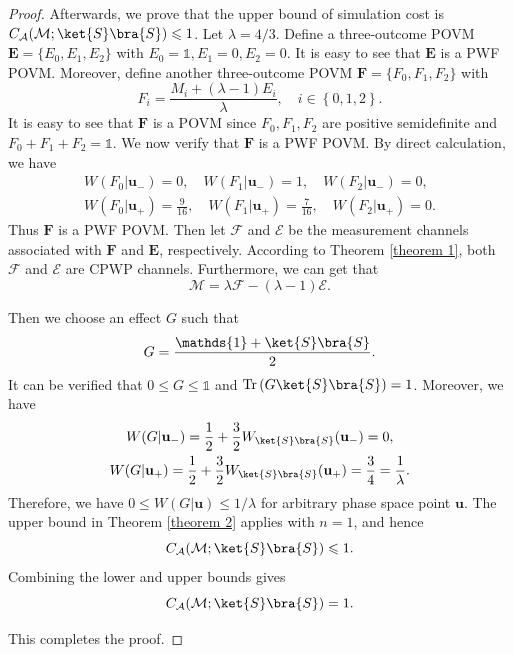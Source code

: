 \documentclass[aps,pra,twocolumn,floatfix,amsfonts,10pt]{revtex4-2}
\begin{document}
\begin{proof}
	Afterwards, we prove that the upper bound of simulation cost is $C_{\mathcal{A}}(\mathcal{M};\ket{S}\bra{S}) \leqslant 1$.
	Let $\lambda=4/3$.
	Define a three-outcome POVM $\mathbf{E}=\{E_0,E_1,E_2\}$ with $E_0=\mathds{1}, E_1=0, E_2=0$.
	It is easy to see that $\mathbf{E}$ is a PWF POVM.
	Moreover, define another three-outcome POVM $\mathbf{F}=\{F_0,F_1,F_2\}$ with
	\begin{equation}
		F_i = \frac{M_i+(\lambda-1)E_i}{\lambda}, \quad i \in \left\{0,1,2\right\}.
	\end{equation}
	It is easy to see that $\mathbf{F}$ is a POVM since $F_0,F_1,F_2$ are positive semidefinite and $F_0+F_1+F_2 = \mathds{1}$. 
	We now verify that $\mathbf{F}$ is a PWF POVM. 
	By direct calculation, we have
	\begin{gather}
		W(F_0|\mathbf{u}_-) = 0, \quad W(F_1|\mathbf{u}_-) = 1, \quad W(F_2|\mathbf{u}_-) = 0, \\ W(F_0|\mathbf{u}_+) = \frac{9}{16}, \quad W(F_1|\mathbf{u}_+) = \frac{7}{16}, \quad W(F_2|\mathbf{u}_+)=0.
	\end{gather}
	Thus $\mathbf{F}$ is a PWF POVM. 
	Then let $\mathcal{F}$ and $\mathcal{E}$ be the measurement channels associated with $\mathbf{F}$ and $\mathbf{E}$, respectively. 
	According to Theorem \ref{theorem 1}, both $\mathcal{F}$ and $\mathcal{E}$ are CPWP channels. 
	Furthermore, we can get that
	\begin{equation}
		\mathcal{M} = \lambda\mathcal{F}-(\lambda-1)\mathcal{E}.
	\end{equation}

	Then we choose an effect $G$ such that
	\begin{equation}
		G = \frac{\mathds{1}+\ket{S}\bra{S}}{2}.
	\end{equation}
	It can be verified that  $0\leqslant G\leqslant\mathds{1}$ and $\mathrm{Tr}\left(G\ket{S}\bra{S}\right) = 1$.
	Moreover, we have
	\begin{gather}
		W(G|\mathbf{u}_-) = \frac{1}{2}+\frac{3}{2}W_{\ket{S}\bra{S}}(\mathbf{u}_-) = 0, \\ W(G|\mathbf{u}_+) = \frac{1}{2}+\frac{3}{2}W_{\ket{S}\bra{S}}(\mathbf{u}_+) = \frac{3}{4} = \frac{1}{\lambda}.
	\end{gather}
	Therefore, we have $0\leqslant W(G|\mathbf{u}) \leqslant 1/\lambda$ for arbitrary phase space point $\mathbf{u}$.
	The upper bound in Theorem \ref{theorem 2} applies with $n=1$, and hence
	\begin{equation}
	C_{\mathcal{A}}(\mathcal{M};\ket{S}\bra{S}) \leqslant 1.
	\end{equation}
	Combining the lower and upper bounds gives
	\begin{equation}
	C_{\mathcal{A}}(\mathcal{M};\ket{S}\bra{S}) = 1.
	\end{equation}
	
	This completes the proof.
\end{proof}
\end{document}
